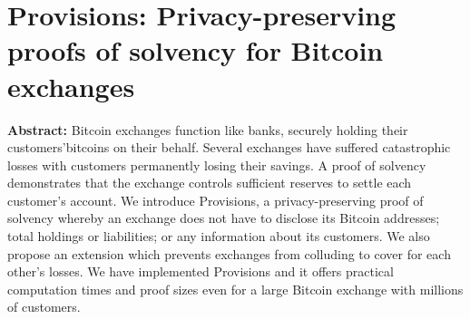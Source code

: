 \section{Provisions: Privacy-preserving proofs of solvency for Bitcoin exchanges }

\textbf{Abstract:} 
Bitcoin exchanges function like banks, securely holding their customers’bitcoins on their behalf. Several exchanges have suffered catastrophic losses with customers permanently losing their savings. A proof of solvency demonstrates that the exchange controls sufficient reserves to settle each customer’s account. We introduce Provisions, a privacy-preserving proof of solvency whereby an exchange does not have to disclose its Bitcoin addresses; total holdings or liabilities; or any information about its customers. We also propose an extension which prevents exchanges from colluding to cover for each other’s losses. We have implemented Provisions and it offers practical computation times and proof sizes even for a large Bitcoin exchange with millions of customers.
